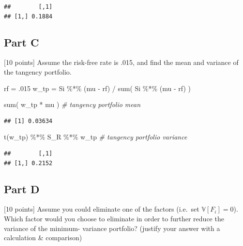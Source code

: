 \documentclass[
  oneside]{book}
\newenvironment{Shaded}{\begin{snugshade}}{\end{snugshade}}
\newcommand{\CommentTok}[1]{\textcolor[rgb]{0.56,0.35,0.01}{\textit{#1}}}
\newcommand{\DecValTok}[1]{\textcolor[rgb]{0.00,0.00,0.81}{#1}}
\newcommand{\FunctionTok}[1]{\textcolor[rgb]{0.00,0.00,0.00}{#1}}
\newcommand{\NormalTok}[1]{#1}
\newcommand{\OtherTok}[1]{\textcolor[rgb]{0.56,0.35,0.01}{#1}}
\newcommand{\SpecialCharTok}[1]{\textcolor[rgb]{0.00,0.00,0.00}{#1}}
\begin{document}
\begin{verbatim}
##        [,1]
## [1,] 0.1884
\end{verbatim}

\hypertarget{part-c-8}{%
\subsection{Part C}\label{part-c-8}}

{[}10 points{]} Assume the risk-free rate is .015, and find the mean and variance of the tangency portfolio.

\begin{Shaded}
\begin{Highlighting}[]
\NormalTok{rf }\OtherTok{=}\NormalTok{ .}\DecValTok{015}
\NormalTok{w\_tp }\OtherTok{=}\NormalTok{ Si }\SpecialCharTok{\%*\%}\NormalTok{ (mu }\SpecialCharTok{{-}}\NormalTok{ rf) }\SpecialCharTok{/} \FunctionTok{sum}\NormalTok{( Si }\SpecialCharTok{\%*\%}\NormalTok{ (mu }\SpecialCharTok{{-}}\NormalTok{ rf) )}

\FunctionTok{sum}\NormalTok{( w\_tp }\SpecialCharTok{*}\NormalTok{ mu ) }\CommentTok{\# tangency portfolio mean }
\end{Highlighting}
\end{Shaded}

\begin{verbatim}
## [1] 0.03634
\end{verbatim}

\begin{Shaded}
\begin{Highlighting}[]
\FunctionTok{t}\NormalTok{(w\_tp) }\SpecialCharTok{\%*\%}\NormalTok{ S\_R }\SpecialCharTok{\%*\%}\NormalTok{ w\_tp }\CommentTok{\# tangency portfolio variance }
\end{Highlighting}
\end{Shaded}

\begin{verbatim}
##        [,1]
## [1,] 0.2152
\end{verbatim}

\hypertarget{part-d-2}{%
\subsection{Part D}\label{part-d-2}}

{[}10 points{]} Assume you could eliminate one of the factors (i.e.~set \(\mathbb{V}[F_i] = 0\)). Which factor would you choose to eliminate in order to further reduce the variance of the minimum- variance portfolio? (justify your answer with a calculation \& comparison)
\end{document}
